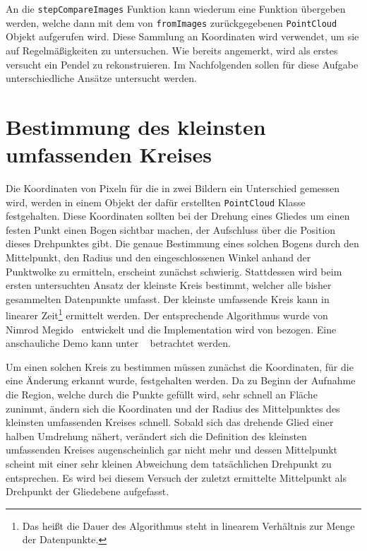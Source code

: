 An die \lstinline{stepCompareImages} Funktion kann wiederum eine Funktion übergeben werden, welche dann mit dem von \lstinline{fromImages} zurückgegebenen \lstinline{PointCloud} Objekt aufgerufen wird.
Diese Sammlung an Koordinaten wird verwendet, um sie auf Regelmä{\ss}igkeiten zu untersuchen.
Wie bereits angemerkt, wird als erstes versucht ein Pendel zu rekonstruieren.
Im Nachfolgenden sollen für diese Aufgabe unterschiedliche Ansätze untersucht werden.

\section{Bestimmung des kleinsten umfassenden Kreises}

Die Koordinaten von Pixeln für die in zwei Bildern ein Unterschied gemessen wird, werden in einem Objekt der dafür erstellten \lstinline{PointCloud} Klasse festgehalten.
Diese Koordinaten sollten bei der Drehung eines Gliedes um einen festen Punkt einen Bogen sichtbar machen, der Aufschluss über die Position dieses Drehpunktes gibt.
Die genaue Bestimmung eines solchen Bogens durch den Mittelpunkt, den Radius und den eingeschlossenen Winkel anhand der Punktwolke zu ermitteln, erscheint zunächst schwierig.
Stattdessen wird beim ersten untersuchten Ansatz der kleinste Kreis bestimmt, welcher alle bisher gesammelten Datenpunkte umfasst.
Der kleinste umfassende Kreis kann in linearer Zeit\footnote{Das hei{\ss}t die Dauer des Algorithmus steht in linearem Verhältnis zur Menge der Datenpunkte.} ermittelt werden.
Der entsprechende Algorithmus wurde von Nimrod Megido~\cite{Megiddo1983} entwickelt und die Implementation wird von  bezogen.
Eine anschauliche Demo kann unter ~\cite{Nayuki2021} betrachtet werden.

Um einen solchen Kreis zu bestimmen müssen zunächst die Koordinaten, für die eine Änderung erkannt wurde, festgehalten werden.
Da zu Beginn der Aufnahme die Region, welche durch die Punkte gefüllt wird, sehr schnell an Fläche zunimmt, ändern sich die Koordinaten und der Radius des Mittelpunktes des kleinsten umfassenden Kreises schnell.
Sobald sich das drehende Glied einer halben Umdrehung nähert, verändert sich die Definition des kleinsten umfassenden Kreises augenscheinlich gar nicht mehr und dessen Mittelpunkt scheint mit einer sehr kleinen Abweichung dem tatsächlichen Drehpunkt zu entsprechen.
Es wird bei diesem Versuch der zuletzt ermittelte Mittelpunkt als Drehpunkt der Gliedebene aufgefasst.


